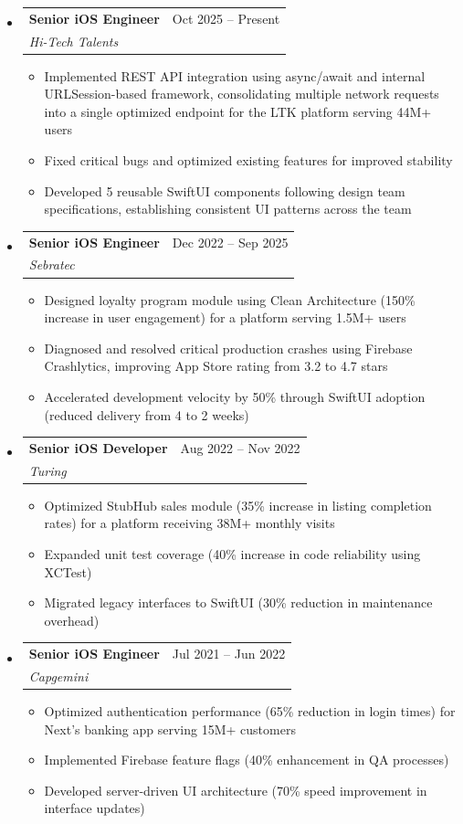 \documentclass[11pt,letterpaper]{article}
\makeatletter
\newcommand{\resumeSubheading}[4]{
  \item
    \begin{tabular*}{\textwidth}{l@{\extracolsep{\fill}}r}
      \textbf{#1} & #2 \\
      \textit{#3} & \textit{#4} \\
    \end{tabular*}
}
\newcommand{\resumeItem}[1]{
  \item\small{#1}
}
\makeatother
\begin{document}
\begin{itemize}[leftmargin=0.15in]
    \resumeSubheading
        {Senior iOS Engineer}{Oct 2025 -- Present}
        {Hi-Tech Talents}{}
        \begin{itemize}
            \resumeItem{Implemented REST API integration using async/await and internal URLSession-based framework, consolidating multiple network requests into a single optimized endpoint for the LTK platform serving 44M+ users}
            \resumeItem{Fixed critical bugs and optimized existing features for improved stability}
            \resumeItem{Developed 5 reusable SwiftUI components following design team specifications, establishing consistent UI patterns across the team}
        \end{itemize}

    \resumeSubheading
        {Senior iOS Engineer}{Dec 2022 -- Sep 2025}
        {Sebratec}{}
        \begin{itemize}
            \resumeItem{Designed loyalty program module using Clean Architecture (150\% increase in user engagement) for a platform serving 1.5M+ users}
            \resumeItem{Diagnosed and resolved critical production crashes using Firebase Crashlytics, improving App Store rating from 3.2 to 4.7 stars}
            \resumeItem{Accelerated development velocity by 50\% through SwiftUI adoption (reduced delivery from 4 to 2 weeks)}
        \end{itemize}

    \resumeSubheading
        {Senior iOS Developer}{Aug 2022 -- Nov 2022}
        {Turing}{}
        \begin{itemize}
            \resumeItem{Optimized StubHub sales module (35\% increase in listing completion rates) for a platform receiving 38M+ monthly visits}
            \resumeItem{Expanded unit test coverage (40\% increase in code reliability using XCTest)}
            \resumeItem{Migrated legacy interfaces to SwiftUI (30\% reduction in maintenance overhead)}
        \end{itemize}

    \resumeSubheading
        {Senior iOS Engineer}{Jul 2021 -- Jun 2022}
        {Capgemini}{}
        \begin{itemize}
            \resumeItem{Optimized authentication performance (65\% reduction in login times) for Next's banking app serving 15M+ customers}
            \resumeItem{Implemented Firebase feature flags (40\% enhancement in QA processes)}
            \resumeItem{Developed server-driven UI architecture (70\% speed improvement in interface updates)}
        \end{itemize}


\end{itemize}
\end{document}

